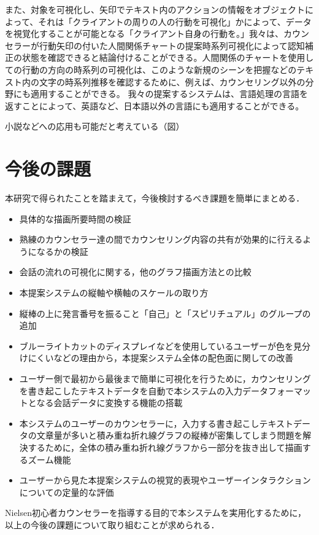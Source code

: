 \documentclass[shuuron]{kuee}
\begin{document}
  また、対象を可視化し、矢印でテキスト内のアクションの情報をオブジェクトによって、それは「クライアントの周りの人の行動を可視化」かによって、データを視覚化することが可能となる「クライアント自身の行動を。」我々は、カウンセラーが行動矢印の付いた人間関係チャートの提案時系列可視化によって認知補正の状態を確認できると結論付けることができる。人間関係のチャートを使用しての行動の方向の時系列の可視化は、このような新規のシーンを把握などのテキスト内の文字の時系列推移を確認するために、例えば、カウンセリング以外の分野にも適用することができる。
    我々の提案するシステムは、言語処理の言語を返すことによって、英語など、日本語以外の言語にも適用することができる。

小説などへの応用も可能だと考えている（図）

\section{今後の課題}

本研究で得られたことを踏まえて，今後検討するべき課題を簡単にまとめる．

\begin{itemize}
\item 具体的な描画所要時間の検証
\item 熟練のカウンセラー達の間でカウンセリング内容の共有が効果的に行えるようになるかの検証
\item 会話の流れの可視化に関する，他のグラフ描画方法との比較
\item 本提案システムの縦軸や横軸のスケールの取り方
\item 縦棒の上に発言番号を振ること「自己」と「スピリチュアル」のグループの追加
\item ブルーライトカットのディスプレイなどを使用しているユーザーが色を見分けにくいなどの理由から，本提案システム全体の配色面に関しての改善
\item ユーザー側で最初から最後まで簡単に可視化を行うために，カウンセリングを書き起こしたテキストデータを自動で本システムの入力データフォーマットとなる会話データに変換する機能の搭載
\item 本システムのユーザーのカウンセラーに，入力する書き起こしテキストデータの文章量が多いと積み重ね折れ線グラフの縦棒が密集してしまう問題を解決するために，全体の積み重ね折れ線グラフから一部分を抜き出して描画するズーム機能
\item ユーザーから見た本提案システムの視覚的表現やユーザーインタラクションについての定量的な評価
\end{itemize}

Nielsen初心者カウンセラーを指導する目的で本システムを実用化するために，以上の今後の課題について取り組むことが求められる．%
\end{document}
